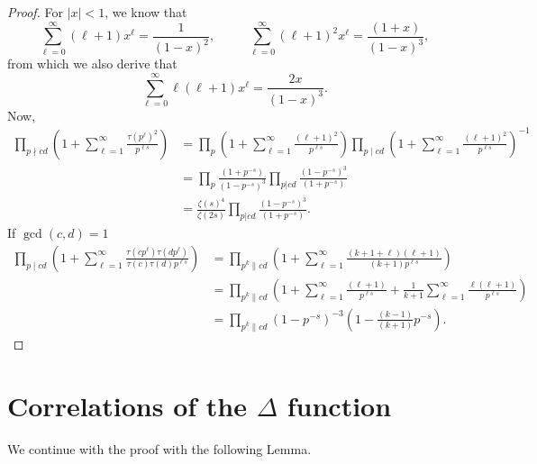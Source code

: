 \documentclass[a4paper,12pt, reqn0]{amsart}
\theoremstyle{remark}
\begin{document}
\begin{proof}
For $|x|<1$, we know that
\begin{equation*}
  \sum_{\ell= 0}^\infty(\ell+1)x^{\ell}
  = \frac{1}{(1-x)^{2}},
  \;\;\quad\quad
  \sum_{\ell=0}^\infty(\ell+1)^{2}x^{\ell}
  = \frac{(1+x)}{(1-x)^{3}},
\end{equation*}
from which we also derive that
\begin{equation*}
  \sum_{\ell=0}^\infty\ell(\ell+1) x^{\ell}= \frac{2x}{(1-x)^{3}}.
\end{equation*}
Now,
\begin{align*}
  \prod_{p\nmid cd } \left(1 + \sum_{\ell=
  1}^\infty\frac{\tau(p^\ell)^{2}}{p^{\ell s}} \right)
  &= \prod_{p } \left(1 + \sum_{\ell= 1}^\infty\frac{(\ell+1)^{2}}{p^{\ell
    s}} \right)
    \prod_{p\mid cd } \left(1 + \sum_{\ell=
    1}^\infty\frac{(\ell+1)^{2}}{p^{\ell s}} \right)^{-1}\\
  &=\prod_{p } \frac{\left(1+ p^{-s}\right)}{\left(1- p^{-s}\right)^{3}}\prod_{p| cd } \frac{\left(1- p^{-s}\right)^{3}}{\left(1+ p^{-s}\right)}\\
  &=\frac{\zeta(s)^4}{\zeta(2s)} \prod_{p| cd } \frac{\left(1- p^{-s}\right)^{3}}{\left(1+ p^{-s}\right)}.
\end{align*}	
If $\gcd(c,d)=1$
\begin{align*} 
  \prod_{p\mid cd } \left(1 + \sum_{\ell= 1}^\infty
  \frac{\tau(cp^\ell)\tau(dp^\ell)}{\tau(c) \tau(d) p^{\ell s}} \right)
  &=\prod_{p^{k}\| cd }
    \left(1 + \sum_{\ell= 1}^\infty\frac{(k+1+\ell)(\ell+1)}{(k+1)p^{\ell s}} \right) \\
  &=\prod_{p^{k}\| cd }
    \left( 1+ \sum_{\ell= 1}^\infty\frac{(\ell+1)}{p^{\ell s}}
    +\frac{1}{k+1}\sum_{\ell= 1}^\infty\frac{\ell(\ell+1)}{p^{\ell s}} \right)\\
  &=\prod_{p^{k}\| cd } \left(1- p^{-s}\right)^{-3}\left(1-\tfrac{(k-1)}{(k+1)} p^{-s}\right).
\end{align*}
	
\end{proof}	
\section{Correlations of the $\Delta$ function}

We continue with the proof with the following Lemma.
\end{document}
